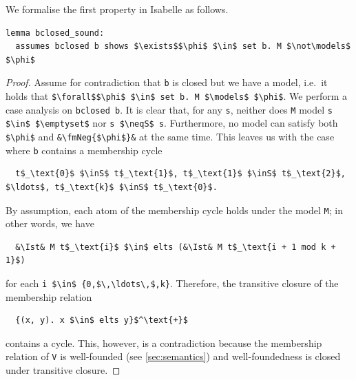 \documentclass[
  sigplan,
  10pt,
  ]{acmart}
\newcommand{\inS}{\in_\text{s}}
\newcommand{\neqS}{\neq_\text{s}}
\newcommand{\Ist}{I$_\text{st}$}
\newcommand{\fmNegSymbol}{\boldsymbol{\neg}}
\newcommand{\fmNeg}[1]{$\fmNegSymbol$ #1}
\begin{document}
We formalise the first property in Isabelle as follows.
\begin{lstlisting}[belowskip=0pt,label={lst:bclosed_sound}]
lemma bclosed_sound:
  assumes bclosed b shows $\exists$$\phi$ $\in$ set b. M $\not\models$ $\phi$
\end{lstlisting}
\begin{proof}
  Assume for contradiction that \lstinline!b! is closed but we have a model, i.e.\ it holds that \lstinline!$\forall$$\phi$ $\in$ set b. M $\models$ $\phi$!.
  We perform a case analysis on \lstinline!bclosed b!.
  It is clear that, for any \lstinline!s!, neither does \lstinline!M! model \lstinline!s $\in$ $\emptyset$! nor \lstinline!s $\neqS$ s!.
  Furthermore, no model can satisfy both \lstinline!$\phi$! and \lstinline!&\fmNeg{$\phi$}&! at the same time.
  This leaves us with the case where \lstinline!b! contains a membership cycle
\begin{lstlisting}
  t$_\text{0}$ $\inS$ t$_\text{1}$, t$_\text{1}$ $\inS$ t$_\text{2}$, $\ldots$, t$_\text{k}$ $\inS$ t$_\text{0}$.
\end{lstlisting}
  By assumption, each atom of the membership cycle holds under the model \lstinline!M!; in other words, we have
\begin{lstlisting}
  &\Ist& M t$_\text{i}$ $\in$ elts (&\Ist& M t$_\text{i + 1 mod k + 1}$)
\end{lstlisting}
  for each \lstinline!i $\in$ {0,$\,\ldots\,$,k}!.
  Therefore, the transitive closure of the membership relation
\begin{lstlisting}
  {(x, y). x $\in$ elts y}$^\text{+}$ 
\end{lstlisting}
  contains a cycle.
  This, however, is a contradiction because the membership relation of \lstinline!V! is well-founded (see \autoref{sec:semantics}) and well-foundedness is closed under transitive closure.
\end{proof}
\end{document}
